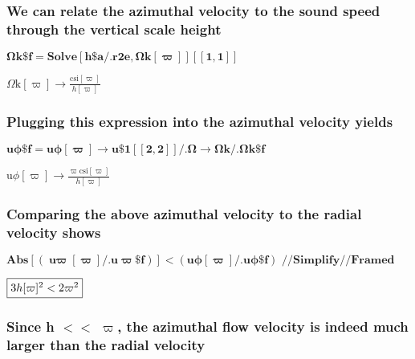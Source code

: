 \documentclass{article}
\begin{document}
\subsubsection*{We can relate the azimuthal velocity to the sound speed through the vertical scale height}

\begin{doublespace}
\noindent\(\pmb{\text{$\Omega $k$\$$f} = \text{Solve}[\text{h$\$$a} \text{/.} \text{r2e}, \text{$\Omega $k}[\varpi ]][[1,1]]}\)
\end{doublespace}

\begin{doublespace}
\noindent\(\text{$\Omega $k}[\varpi ]\to \frac{\text{csi}[\varpi ]}{h[\varpi ]}\)
\end{doublespace}

\subsubsection*{Plugging this expression into the azimuthal velocity yields}

\begin{doublespace}
\noindent\(\pmb{\text{u$\phi \$$f} =\text{u$\phi $}[\varpi ] \to  \text{u$\$$1}[[2,2]] \text{/.} \Omega  \to  \text{$\Omega $k} \text{/.} \text{$\Omega
$k$\$$f}}\)
\end{doublespace}

\begin{doublespace}
\noindent\(\text{u$\phi $}[\varpi ]\to \frac{\varpi  \text{csi}[\varpi ]}{h[\varpi ]}\)
\end{doublespace}

\subsubsection*{Comparing the above azimuthal velocity to the radial velocity shows}

\begin{doublespace}
\noindent\(\pmb{\text{Abs}[(\text{u$\varpi $}[\varpi ]\text{/.}\text{u$\varpi \$$f})] < (\text{u$\phi $}[\varpi ] \text{/.} \text{u$\phi \$$f})\text{
 }\text{//}\text{Simplify} \text{//}\text{Framed}}\)
\end{doublespace}

\begin{doublespace}
\noindent\(\fbox{$3 h[\varpi ]^2<2 \varpi ^2$}\)
\end{doublespace}

\subsubsection*{Since h $<<$ $\varpi $, the azimuthal flow velocity is indeed much larger than the radial velocity}
\end{document}
